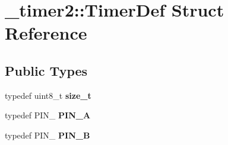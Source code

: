 \hypertarget{struct__timer2_1_1TimerDef}{}\section{\+\_\+timer2\+:\+:Timer\+Def Struct Reference}
\label{struct__timer2_1_1TimerDef}
\subsection*{Public Types}
\begin{DoxyCompactItemize}
\item 
\hypertarget{struct__timer2_1_1TimerDef_a4de2d0355f8365156f840b61eb29907d}{}\label{struct__timer2_1_1TimerDef_a4de2d0355f8365156f840b61eb29907d} 
typedef uint8\+\_\+t {\bfseries size\+\_\+t}
\item 
\hypertarget{struct__timer2_1_1TimerDef_acfaae68213dbf4d8e66001bdcfd4938c}{}\label{struct__timer2_1_1TimerDef_acfaae68213dbf4d8e66001bdcfd4938c} 
typedef P\+I\+N\+\_ {\bfseries P\+I\+N\+\_\+A}
\item 
\hypertarget{struct__timer2_1_1TimerDef_af4f3372005a05f2aa242f3d3fb942267}{}\label{struct__timer2_1_1TimerDef_af4f3372005a05f2aa242f3d3fb942267} 
typedef P\+I\+N\+\_ {\bfseries P\+I\+N\+\_\+B}
\end{DoxyCompactItemize}

